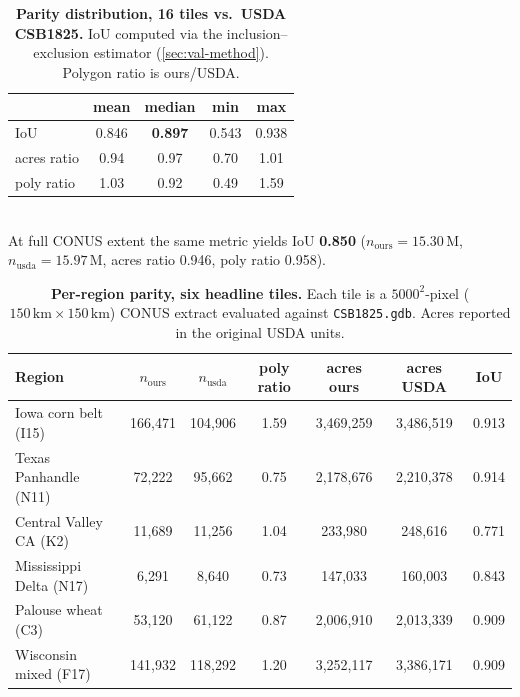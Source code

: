 \documentclass[preprint,12pt]{elsarticle}
\begin{document}
\begin{table}[t]
\centering
\caption{\textbf{Parity distribution, 16 tiles vs.\ USDA CSB1825.}
IoU computed via the inclusion--exclusion estimator
(\cref{sec:val-method}). Polygon ratio is ours/USDA.}
\label{tab:parity-summary}
\small
\begin{tabular}{lcccc}
\toprule
                & mean & median & min & max \\
\midrule
IoU             & 0.846 & \textbf{0.897} & 0.543 & 0.938 \\
acres ratio     & 0.94  & 0.97           & 0.70  & 1.01 \\
poly ratio      & 1.03  & 0.92           & 0.49  & 1.59 \\
\bottomrule
\end{tabular}
\vspace{0.4em}\\
At full CONUS extent the same metric yields IoU \textbf{0.850}
($n_\text{ours}{=}15.30\,\text{M}$, $n_\text{usda}{=}15.97\,\text{M}$,
acres ratio 0.946, poly ratio 0.958).
\end{table}

\begin{table}[t]
\centering
\caption{\textbf{Per-region parity, six headline tiles.} Each tile is a
$5000^2$-pixel ($150\,\text{km} \times 150\,\text{km}$) CONUS extract evaluated against
\texttt{CSB1825.gdb}. Acres reported in the original USDA units.}
\label{tab:parity-detail}
\small
\setlength{\tabcolsep}{4pt}
\begin{tabular}{lcccccc}
\toprule
Region & $n_\text{ours}$ & $n_\text{usda}$ & poly ratio & acres ours & acres USDA & IoU \\
\midrule
Iowa corn belt (I15)        & 166{,}471 & 104{,}906 & 1.59 & 3{,}469{,}259 & 3{,}486{,}519 & 0.913 \\
Texas Panhandle (N11)       &  72{,}222 &  95{,}662 & 0.75 & 2{,}178{,}676 & 2{,}210{,}378 & 0.914 \\
Central Valley CA (K2)      &  11{,}689 &  11{,}256 & 1.04 &   233{,}980   &   248{,}616   & 0.771 \\
Mississippi Delta (N17)     &   6{,}291 &   8{,}640 & 0.73 &   147{,}033   &   160{,}003   & 0.843 \\
Palouse wheat (C3)          &  53{,}120 &  61{,}122 & 0.87 & 2{,}006{,}910 & 2{,}013{,}339 & 0.909 \\
Wisconsin mixed (F17)       & 141{,}932 & 118{,}292 & 1.20 & 3{,}252{,}117 & 3{,}386{,}171 & 0.909 \\
\bottomrule
\end{tabular}
\end{table}
\end{document}
